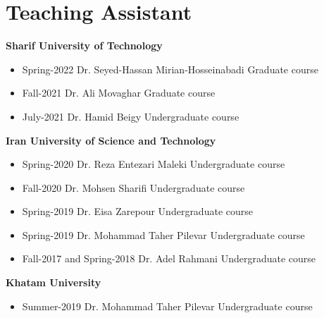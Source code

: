 \section{Teaching Assistant}
\noindent \textbf{Sharif University of Technology} \par
{\renewcommand\labelitemi{}
\begin{itemize}[noitemsep,topsep=0pt,parsep=0pt,partopsep=0pt]
	\item {}
		{Spring-2022}
		{Dr. Seyed-Hassan Mirian-Hosseinabadi}
		{Graduate course}
	\item {}
		{Fall-2021}
		{Dr. Ali Movaghar}
		{Graduate course}
	\item {}
		{July-2021}
		{Dr. Hamid Beigy}
		{Undergraduate course}
\end{itemize}
}

\noindent \textbf{Iran University of Science and Technology} \par
{
    \renewcommand\labelitemi{}
    \begin{itemize}[noitemsep,topsep=0pt,parsep=0pt,partopsep=0pt]
		\item {}
			{Spring-2020}
			{Dr. Reza Entezari Maleki}
			{Undergraduate course}
		\item {}
			{Fall-2020}
			{Dr. Mohsen Sharifi}
			{Undergraduate course}
		\item {}
			{Spring-2019}
			{Dr. Eisa Zarepour}
			{Undergraduate course}
		\item {}
			{Spring-2019}
			{Dr. Mohammad Taher Pilevar}
			{Undergraduate course}
		\item {}
			{Fall-2017 and Spring-2018}
			{Dr. Adel Rahmani}
			{Undergraduate course}
    \end{itemize}
}

{
\renewcommand\labelitemi{}
\noindent \textbf{Khatam University} \par
\begin{itemize}[noitemsep,topsep=0pt,parsep=0pt,partopsep=0pt]
	\item {}
		{Summer-2019}
		{Dr. Mohammad Taher Pilevar}
		{Undergraduate course}
\end{itemize}
}
